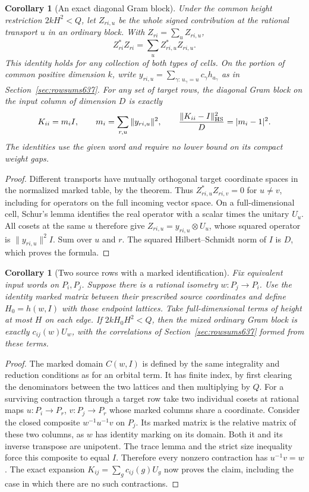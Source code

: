 \documentclass[a4paper,11pt]{article}
\newtheorem{corollary}[proposition]{Corollary}
\theoremstyle{definition}
\theoremstyle{remark}
\numberwithin{equation}{section}
\begin{document}
\begin{corollary}[An exact diagonal Gram block]
\leavevmode\label{cor:exactdiagonal638}
Under the common height restriction \(2kH^2<Q\), let \(Z_{ri,u}\)
be the whole signed contribution at the rational transport \(u\)
in an ordinary block. With \(Z_{ri}=\sum_u Z_{ri,u}\),
\[
              Z_{ri}^* Z_{ri}=\sum_u Z_{ri,u}^*Z_{ri,u}.
\]
This identity holds for any collection of both types of cells.
On the portion of common positive dimension \(k\), write
\(y_{ri,u}=\sum_{\gamma:\,u_\gamma=u}c_\gamma h_{a_\gamma}\)
as in Section~\ref{sec:rowsums637}. For any set of target rows,
the diagonal Gram block on the input column of dimension \(D\) is
exactly
\[
       K_{ii}=m_i I,\qquad m_i=\sum_{r,u}\|y_{ri,u}\|^2,
       \qquad
       \frac{\|K_{ii}-I\|_{\rm HS}^2}{D}=|m_i-1|^2 .
\]
The identities use the given word and require no lower bound on
its compact weight gaps.
\end{corollary}
\begin{proof}
Different transports have mutually orthogonal target coordinate
spaces in the normalized marked table, by the theorem. Thus
\(Z_{ri,u}^*Z_{ri,v}=0\) for \(u\ne v\), including for operators
on the full incoming vector space. On a full-dimensional cell,
Schur's lemma identifies the real operator with a scalar times
the unitary \(U_u\). All cosets at the same \(u\) therefore give
\(Z_{ri,u}=y_{ri,u}\otimes U_u\), whose squared operator is
\(\|y_{ri,u}\|^2 I\). Sum over \(u\) and \(r\). The squared
Hilbert--Schmidt norm of \(I\) is \(D\), which proves the formula.
\end{proof}

\begin{corollary}[Two source rows with a marked identification]
\leavevmode\label{cor:alignedrows638}
Fix equivalent input words on \(P_i,P_j\). Suppose there is a
rational isometry \(w:P_j\to P_i\). Use the identity marked
matrix between their prescribed source coordinates and define
\(H_0=h(w,I)\) with those endpoint lattices. Take
full-dimensional terms of height at most \(H\) on each edge.
If \(2k H_0 H^2<Q\), then the mixed ordinary Gram block is
exactly \(c_{ij}(w)U_w\), with the correlations of
Section~\ref{sec:rowsums637} formed from these terms.
\end{corollary}
\begin{proof}
The marked domain \(C(w,I)\) is defined by the same integrality
and reduction conditions as for an orbital term. It has finite
index, by first clearing the denominators between the two
lattices and then multiplying by \(Q\). For a surviving
contraction through a target row take two individual cosets
at rational maps \(u:P_i\to P_r\), \(v:P_j\to P_r\) whose
marked columns share a coordinate. Consider the closed composite
\(w^{-1}u^{-1}v\) on \(P_j\). Its marked matrix is the relative
matrix of these two columns, as \(w\) has identity marking on its
domain. Both it and its inverse transpose are unipotent. The
trace lemma and the strict size inequality force this composite
to equal \(I\). Therefore every nonzero contraction has
\(u^{-1}v=w\). The exact expansion
\(K_{ij}=\sum_g c_{ij}(g)U_g\) now proves the claim, including the
case in which there are no such contractions.
\end{proof}
\end{document}

